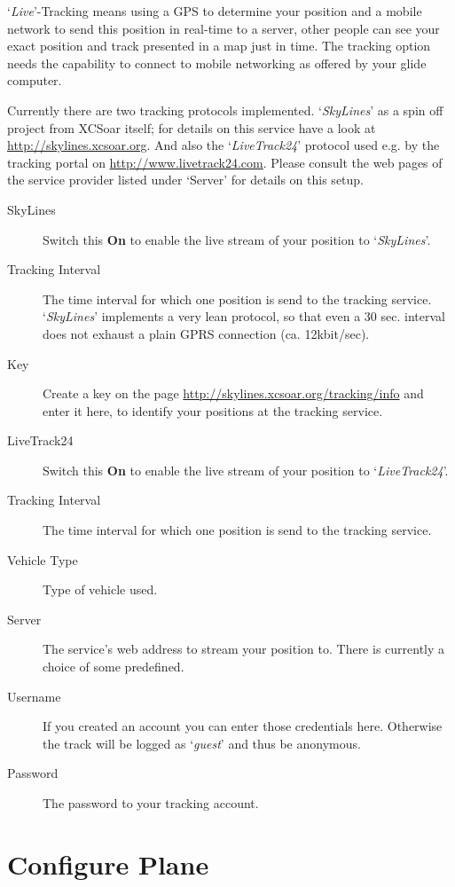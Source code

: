 `{\it Live}'-Tracking means using a GPS to determine your position and a mobile 
network to send this position in real-time to a server, other people can see 
your exact position and track presented in a map just in time.
The tracking option needs the capability to connect to mobile networking as offered by 
your glide computer.

Currently there are two tracking protocols implemented. `{\em SkyLines}' as a spin 
off project from XCSoar itself; for details on this service have a look at 
\url{http://skylines.xcsoar.org}. 
And also the `{\em LiveTrack24}' protocol used e.g. by the tracking 
portal on \url{http://www.livetrack24.com}.  
Please consult the web pages of the service provider listed under `Server' 
for details on this setup.

\begin{description}
\item[SkyLines]  Switch this {\bf On} to enable the live stream of 
  your position to `{\em SkyLines}'.
\item[Tracking Interval]  The time interval for which one position is send to 
  the tracking service. `{\em SkyLines}' implements a very lean protocol, so that even
  a 30 sec. interval does not exhaust a plain GPRS connection (ca. 12kbit/sec). 
\item[Key]  Create a key on the page \url{http://skylines.xcsoar.org/tracking/info} 
  and enter it here, to identify your positions at the tracking service.
\\
\item[LiveTrack24]  Switch this {\bf On} to enable the live stream of 
  your position to `{\em LiveTrack24}'.
\item[Tracking Interval]  The time interval for which one position is send to 
  the tracking service.
\item[Vehicle Type]  Type of vehicle used.
\item[Server]  The service's web address to stream your position to. There is currently 
  a choice of some predefined.
\item[Username]  If you created an account you can enter those credentials here. 
  Otherwise the track will be logged as `{\it guest}' and thus be anonymous.  
\item[Password]  The password to your tracking account.
\end{description}


\section{Configure Plane}

